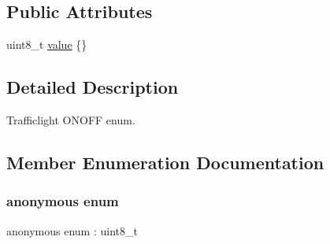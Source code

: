 \subsection*{Public Attributes}
\begin{DoxyCompactItemize}
\item 
uint8\+\_\+t \hyperlink{structmaf__perception__interface_1_1TrafficLightOnOffEnum_ae946a5b9687d12e216fe777bf652e764}{value} \{\}
\end{DoxyCompactItemize}


\subsection{Detailed Description}
Trafficlight O\+N\+O\+FF enum. 

\subsection{Member Enumeration Documentation}
\mbox{\label{structmaf__perception__interface_1_1TrafficLightOnOffEnum_a5c6b1103bef4a2077abedcc7999bef03}} 
\subsubsection{\texorpdfstring{anonymous enum}{anonymous enum}}
{\footnotesize\ttfamily anonymous enum \+: uint8\+\_\+t}

